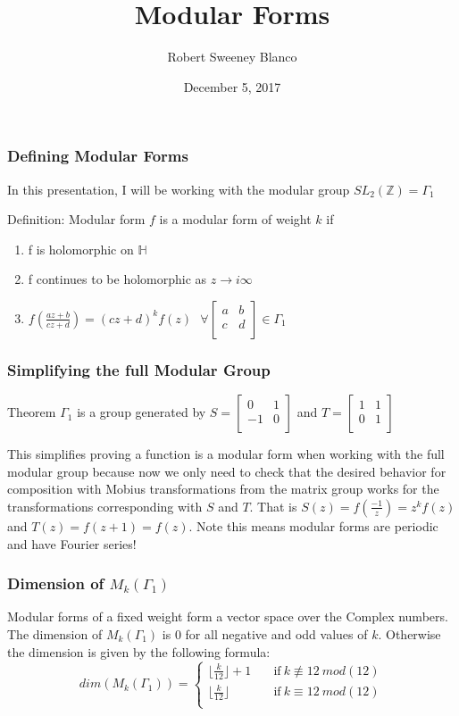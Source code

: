 \documentclass{beamer}
\title{Modular Forms}
\author{Robert Sweeney Blanco}
\institute{Advisor: Brandon Williams}
\date{December 5, 2017}
\begin{document}
 
\frame{\titlepage}
 
\begin{frame}
\frametitle{Defining Modular Forms}
In this presentation, I will be working with the modular group $SL_2(\mathbb{Z}) = \Gamma_1$
\begin{block}{Definition: Modular form}
$f$ is a modular form of weight $k$ if 
\begin{enumerate}
\item  f is holomorphic on $\mathbb{H}$\\
\item f continues to be holomorphic as $z \longrightarrow i\infty$
\item $f(\frac{az+b}{cz+d}) = (cz+d)^k f(z) \  \ \ \forall \begin{bmatrix}
a & b \\
c & d \\
\end{bmatrix} 
\in \Gamma_1$
\end{enumerate}
\end{block}
\end{frame}

\begin{frame}
\frametitle{Simplifying the full Modular Group}
\begin{block}{Theorem}
$\Gamma_1$ is a group generated by $S = \begin{bmatrix}
0 & 1 \\
-1 & 0 \\
\end{bmatrix}$
and $T = \begin{bmatrix}
1 & 1 \\
0 & 1 \\
\end{bmatrix}$
\end{block}
This simplifies proving a function is a modular form when working with the full modular group because now we only need to check that the desired behavior for composition with Mobius transformations from the matrix group works for the transformations corresponding with $S$ and $T$. That is $S(z)=f(\frac{-1}{z}) = z^kf(z)$ and $T(z)=f(z+1)=f(z)$. Note this means modular forms are periodic and have Fourier series!
\end{frame}

\begin{frame}

\frametitle{Dimension of $M_k(\Gamma_1)$}
Modular forms of a fixed weight form a vector space over the Complex numbers. The dimension of $M_k(\Gamma_1)$ is $0$ for all negative and odd values of $k$. Otherwise the dimension is given by the following formula:
\[   
dim(M_k(\Gamma_1)) = 
     \begin{cases}
       \lfloor \frac{k}{12} \rfloor + 1 & \quad \text{if} \  k \not \equiv  12 \ mod(12) \\
       \lfloor \frac{k}{12} \rfloor & \quad \text{if} \  k \equiv  12 \ mod(12) \\
     \end{cases}
\]
\end{frame}
\end{document}
